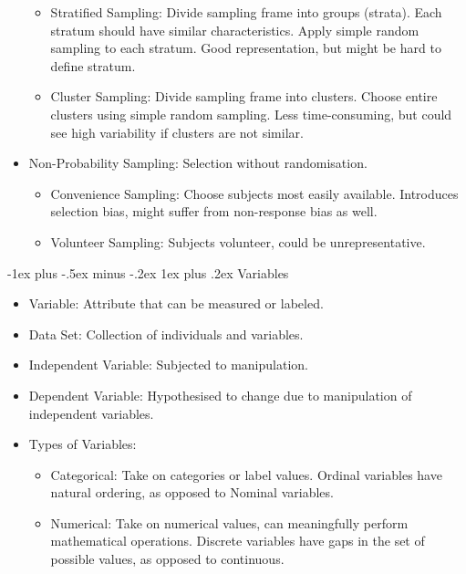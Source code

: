 \documentclass[10pt, landscape]{article}
\makeatletter
\renewcommand{\subsection}{\@startsection{subsection}{3}{0mm}%
                                {-1ex plus -.5ex minus -.2ex}%
                                {1ex plus .2ex}%
                                {\normalfont\small\bfseries}}%
\makeatother
\begin{document}
\begin{multicols*}{3}
\begin{itemize}
\begin{itemize}
        \item Stratified Sampling: Divide sampling frame into groups (strata). Each stratum should have similar characteristics. Apply simple random sampling to each stratum. Good representation, but might be hard to define stratum.
        \item Cluster Sampling: Divide sampling frame into clusters. Choose entire clusters using simple random sampling. Less time-consuming, but could see high variability if clusters are not similar.
    \end{itemize}
    \item Non-Probability Sampling: Selection without randomisation.
    \begin{itemize}
        \item Convenience Sampling: Choose subjects most easily available. Introduces selection bias, might suffer from non-response bias as well.
        \item Volunteer Sampling: Subjects volunteer, could be unrepresentative.
    \end{itemize}
\end{itemize}

\subsection{Variables}
\begin{itemize}
    \item Variable: Attribute that can be measured or labeled.
    \item Data Set: Collection of individuals and variables.
    \item Independent Variable: Subjected to manipulation.
    \item Dependent Variable: Hypothesised to change due to manipulation of independent variables.
    \item Types of Variables:
    \begin{itemize}
        \item Categorical: Take on categories or label values. Ordinal variables have natural ordering, as opposed to Nominal variables.
        \item Numerical: Take on numerical values, can meaningfully perform mathematical operations. Discrete variables have gaps in the set of possible values, as opposed to continuous.
    \end{itemize}
\end{itemize}


\end{multicols*}
\end{document}
